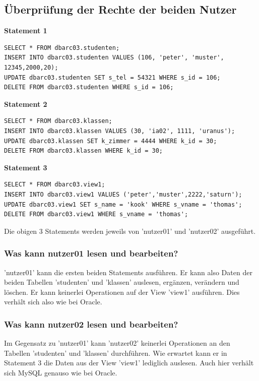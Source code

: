 \documentclass[10pt]{scrreprt}
\newcommand{\Bold}[1]{\textbf{#1}} %
\begin{document}
\subsection{Überprüfung der Rechte der beiden Nutzer}
\Bold{Statement 1}
\begin{lstlisting}[style=sql]
SELECT * FROM dbarc03.studenten;
INSERT INTO dbarc03.studenten VALUES (106, 'peter', 'muster', 12345,2000,20);
UPDATE dbarc03.studenten SET s_tel = 54321 WHERE s_id = 106;
DELETE FROM dbarc03.studenten WHERE s_id = 106;
\end{lstlisting}
\Bold{Statement 2}
\begin{lstlisting}[style=sql]
SELECT * FROM dbarc03.klassen;
INSERT INTO dbarc03.klassen VALUES (30, 'ia02', 1111, 'uranus');
UPDATE dbarc03.klassen SET k_zimmer = 4444 WHERE k_id = 30;
DELETE FROM dbarc03.klassen WHERE k_id = 30;
\end{lstlisting}
\newpage
\Bold{Statement 3}
\begin{lstlisting}[style=sql]
SELECT * FROM dbarc03.view1;
INSERT INTO dbarc03.view1 VALUES ('peter','muster',2222,'saturn');
UPDATE dbarc03.view1 SET s_name = 'kook' WHERE s_vname = 'thomas';
DELETE FROM dbarc03.view1 WHERE s_vname = 'thomas';
\end{lstlisting}
Die obigen 3 Statements werden jeweils von 'nutzer01' und 'nutzer02' ausgeführt.
\subsubsection{Was kann nutzer01 lesen und bearbeiten?}
'nutzer01' kann die ersten beiden Statements ausführen. Er kann also Daten der beiden Tabellen 'studenten' und 'klassen' auslesen, ergänzen, verändern und löschen. Er kann keinerlei Operationen auf der View 'view1' ausführen. Dies verhält sich also wie bei Oracle.
\subsubsection{Was kann nutzer02 lesen und bearbeiten?}
Im Gegensatz zu 'nutzer01' kann 'nutzer02' keinerlei Operationen an den Tabellen 'studenten' und 'klassen' durchführen. Wie erwartet kann er in Statement 3 die Daten aus der View 'view1' lediglich auslesen. Auch hier verhält sich MySQL genauso wie bei Oracle.
\end{document}
